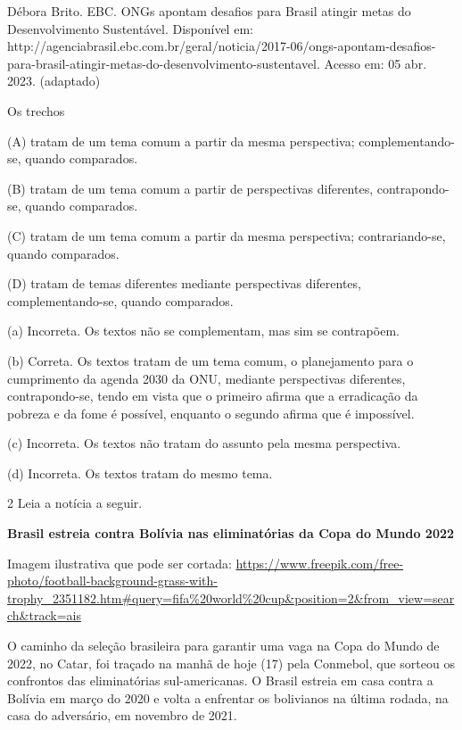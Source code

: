 \begin{itemize}
\begin{itemize}
Débora Brito. EBC. ONGs apontam desafios para Brasil atingir metas do
Desenvolvimento Sustentável. Disponível em:
http://agenciabrasil.ebc.com.br/geral/noticia/2017-06/ongs-apontam-desafios-para-brasil-atingir-metas-do-desenvolvimento-sustentavel.
Acesso em: 05 abr. 2023. (adaptado)

Os trechos

(A) tratam de um tema comum a partir da mesma perspectiva;
complementando-se, quando comparados.

(B) tratam de um tema comum a partir de perspectivas diferentes,
contrapondo-se, quando comparados.

(C) tratam de um tema comum a partir da mesma perspectiva;
contrariando-se, quando comparados.

(D) tratam de temas diferentes mediante perspectivas diferentes,
complementando-se, quando comparados.


(a) Incorreta. Os textos não se complementam, mas sim se contrapõem.

(b) Correta. Os textos tratam de um tema comum, o planejamento para o
cumprimento da agenda 2030 da ONU, mediante perspectivas diferentes,
contrapondo-se, tendo em vista que o primeiro afirma que a erradicação
da pobreza e da fome é possível, enquanto o segundo afirma que é
impossível.

(c) Incorreta. Os textos não tratam do assunto pela mesma perspectiva.

(d) Incorreta. Os textos tratam do mesmo tema.

\num{2} Leia a notícia a seguir.

\textbf{Brasil estreia contra Bolívia nas eliminatórias da Copa do Mundo
2022}

Imagem ilustrativa que pode ser cortada:
\url{https://www.freepik.com/free-photo/football-background-grass-with-trophy_2351182.htm\#query=fifa\%20world\%20cup\&position=2\&from_view=search\&track=ais}

O caminho da seleção brasileira para garantir uma vaga na Copa do Mundo
de 2022, no Catar, foi traçado na manhã de hoje (17) pela Conmebol, que
sorteou os confrontos das eliminatórias sul-americanas. O Brasil estreia
em casa contra a Bolívia em março do 2020 e volta a enfrentar os
bolivianos na última rodada, na casa do adversário, em novembro de 2021.


\end{itemize}
\end{itemize}
